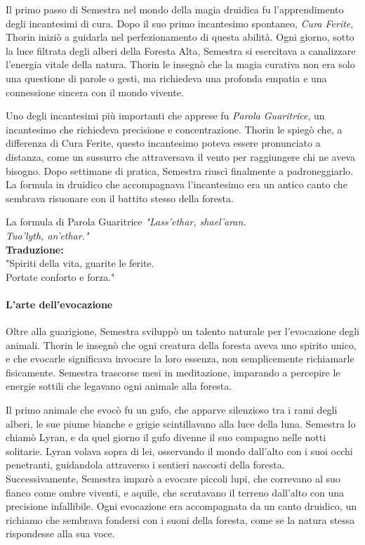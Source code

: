 \documentclass[letterpaper,twocolumn,openany,nodeprecatedcode]{dndbook}
\begin{document}
Il primo passo di Semestra nel mondo della magia druidica fu l’apprendimento degli incantesimi di cura. Dopo il suo primo incantesimo spontaneo, \textit{Cura Ferite}, Thorin iniziò a guidarla nel perfezionamento di questa abilità. Ogni giorno, sotto la luce filtrata degli alberi della Foresta Alta, Semestra si esercitava a canalizzare l’energia vitale della natura. Thorin le insegnò che la magia curativa non era solo una questione di parole o gesti, ma richiedeva una profonda empatia e una connessione sincera con il mondo vivente. 

Uno degli incantesimi più importanti che apprese fu \textit{Parola Guaritrice}, un incantesimo che richiedeva precisione e concentrazione. Thorin le spiegò che, a differenza di Cura Ferite, questo incantesimo poteva essere pronunciato a distanza, come un sussurro che attraversava il vento per raggiungere chi ne aveva bisogno. Dopo settimane di pratica, Semestra riuscì finalmente a padroneggiarlo. La formula in druidico che accompagnava l’incantesimo era un antico canto che sembrava risuonare con il battito stesso della foresta.

\begin{DndSidebar}[float=!h]{La formula di Parola Guaritrice}
  \textit{
    "Lass'ethar, shael'aran.\\
    Tua'lyth, an'ethar."\\
  }
  \textbf{Traduzione:}\\
  "Spiriti della vita, guarite le ferite.\\  
  Portate conforto e forza."
\end{DndSidebar}

\paragraph{L’arte dell’evocazione}

Oltre alla guarigione, Semestra sviluppò un talento naturale per l’evocazione degli animali. Thorin le insegnò che ogni creatura della foresta aveva uno spirito unico, e che evocarle significava invocare la loro essenza, non semplicemente richiamarle fisicamente. Semestra trascorse mesi in meditazione, imparando a percepire le energie sottili che legavano ogni animale alla foresta. 

Il primo animale che evocò fu un gufo, che apparve silenzioso tra i rami degli alberi, le sue piume bianche e grigie scintillavano alla luce della luna. Semestra lo chiamò Lyran, e da quel giorno il gufo divenne il suo compagno nelle notti solitarie. Lyran volava sopra di lei, osservando il mondo dall’alto con i suoi occhi penetranti, guidandola attraverso i sentieri nascosti della foresta. Successivamente, Semestra imparò a evocare piccoli lupi, che correvano al suo fianco come ombre viventi, e aquile, che scrutavano il terreno dall’alto con una precisione infallibile. Ogni evocazione era accompagnata da un canto druidico, un richiamo che sembrava fondersi con i suoni della foresta, come se la natura stessa rispondesse alla sua voce.
\end{document}
